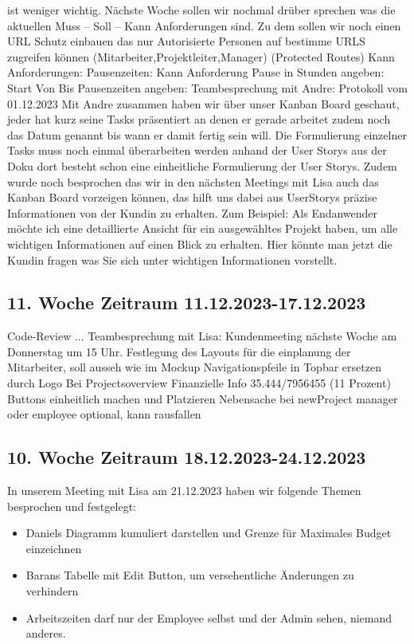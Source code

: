 \documentclass{article}
\begin{document}
ist weniger wichtig. Nächste Woche sollen wir nochmal drüber sprechen was die
aktuellen Muss – Soll – Kann Anforderungen sind. Zu dem sollen wir noch einen
URL Schutz einbauen das nur Autorisierte Personen auf bestimme URLS zugreifen
können (Mitarbeiter,Projektleiter,Manager) (Protected Routes) Kann
Anforderungen: Pausenzeiten: Kann Anforderung Pause in Stunden angeben: Start
Von Bis Pausenzeiten angeben: Teambesprechung mit Andre: Protokoll vom
01.12.2023 Mit Andre zusammen haben wir über unser Kanban Board geschaut, jeder
hat kurz seine Tasks präsentiert an denen er gerade arbeitet zudem noch das
Datum genannt bis wann er damit fertig sein will. Die Formulierung einzelner
Tasks muss noch einmal überarbeiten werden anhand der User Storys aus der Doku
dort besteht schon eine einheitliche Formulierung der User Storys. Zudem wurde
noch besprochen das wir in den nächsten Meetings mit Lisa auch das Kanban Board
vorzeigen können, das hilft uns dabei aus UserStorys präzise Informationen von
der Kundin zu erhalten. Zum Beispiel: Als Endanwender möchte ich eine
detaillierte Ansicht für ein ausgewähltes Projekt haben, um alle wichtigen
Informationen auf einen Blick zu erhalten. Hier könnte man jetzt die Kundin
fragen was Sie sich unter wichtigen Informationen vorstellt.

\subsection{11. Woche Zeitraum 11.12.2023-17.12.2023}
Code-Review ...
Teambesprechung mit Lisa:
Kundenmeeting nächste Woche am Donnerstag um 15 Uhr.
Festlegung des Layouts für die einplanung der Mitarbeiter, soll ausseh wie im Mockup
Navigationspfeile in Topbar ersetzen durch Logo
Bei Projectsoverview Finanzielle Info 35.444/7956455  (11 Prozent)
Buttons einheitlich machen und Platzieren
Nebensache bei newProject manager oder employee optional, kann rausfallen


\subsection{10. Woche Zeitraum 18.12.2023-24.12.2023}
In unserem Meeting mit Lisa am 21.12.2023 haben wir folgende Themen besprochen und festgelegt:
\begin{itemize}
    \item Daniels Diagramm kumuliert darstellen und Grenze für Maximales Budget einzeichnen
    \item Barans Tabelle mit Edit Button, um versehentliche Änderungen zu verhindern
    \item Arbeitszeiten darf nur der Employee selbst und der Admin sehen, niemand anderes.
\end{itemize}
\end{document}
